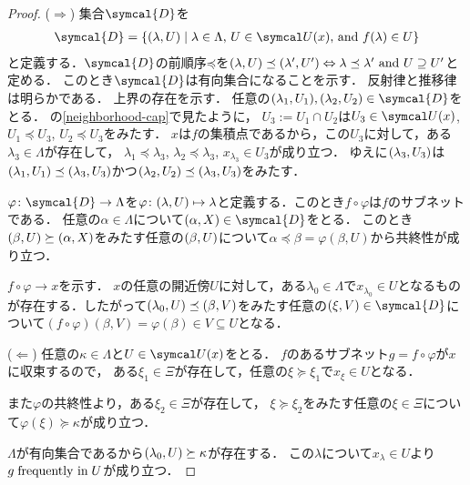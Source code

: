 \documentclass{ltjsbook}
\begin{document}
\begin{proof} (\(\Rightarrow\)) 集合\(\symcal{D}\)を
\begin{align*}
    \symcal{D} = \{\tuple{\lambda, U} \mid \text{\(\lambda \in \Lambda\), \(U \in \OpenNeighborhood{x}\), and \(f(\lambda) \in U\)}\}
\end{align*}
と定義する．\(\symcal{D}\)の前順序\(\mathord{\preceq}\)を\((\lambda, U) \preceq (\lambda', U') \Leftrightarrow \lambda \preceq \lambda'\ \text{and}\ U \supseteq U'\)と定める．
このとき\(\symcal{D}\)は有向集合になることを示す．
反射律と推移律は明らかである．
上界の存在を示す．
任意の\(\tuple{\lambda_1, U_1}, \tuple{\lambda_2, U_2} \in \symcal{D}\)をとる．
の\ref{neighborhood-cap}で見たように，
\(U_3 := U_1 \cap U_2\)は\(U_3 \in \OpenNeighborhood{x}\), \(U_1 \preceq U_3\), \(U_2 \preceq U_3\)をみたす．
\(x\)は\(f\)の集積点であるから，この\(U_3\)に対して，ある\(\lambda_3 \in \Lambda\)が存在して，
\(\lambda_1 \preceq \lambda_3\), \(\lambda_2 \preceq \lambda_3\), \(x_{\lambda_3} \in U_3\)が成り立つ．
ゆえに\((\lambda_3, U_3)\)は\((\lambda_1, U_1) \preceq (\lambda_3, U_3)\)かつ\((\lambda_2, U_2) \preceq (\lambda_3, U_3)\)をみたす．

\(\varphi \colon \symcal{D} \to \Lambda\)を\(\varphi\colon (\lambda, U) \mapsto \lambda\)と定義する．このとき\(f \circ \varphi\)は\(f\)のサブネットである．
任意の\(\alpha \in \Lambda\)について\(\tuple{\alpha, X} \in \symcal{D}\)をとる．
このとき\((\beta, U) \succeq (\alpha, X)\)をみたす任意の\((\beta, U)\)について\(\alpha \preceq \beta = \varphi(\beta, U)\)から共終性が成り立つ．

\(f \circ \varphi \to x\)を示す．
\(x\)の任意の開近傍\(U\)に対して，ある\(\lambda_0 \in \Lambda\)で\(x_{\lambda_0} \in U\)となるものが存在する．したがって\((\lambda_0, U) \preceq (\beta, V)\)をみたす任意の\(\tuple{\xi, V} \in \symcal{D}\)について\((f \circ \varphi)(\beta, V) = \varphi(\beta) \in V \subseteq U\)となる．

\noindent (\(\Leftarrow\)) 任意の\(\kappa \in \Lambda\)と\(U \in \OpenNeighborhood{x}\)をとる．
\(f\)のあるサブネット\(g = f \circ \varphi\)が\(x\)に収束するので，
ある\(\xi_1 \in \Xi\)が存在して，任意の\(\xi \succeq \xi_1\)で\(x_\xi \in U\)となる．

また\(\varphi\)の共終性より，ある\(\xi_2 \in \Xi\)が存在して，
\(\xi \succeq \xi_2\)をみたす任意の\(\xi \in \Xi\)について\(\varphi(\xi) \succeq \kappa\)が成り立つ．

\(\Lambda\)が有向集合であるから\((\lambda_0, U) \succeq \kappa\)が存在する．
この\(\lambda\)について\(x_\lambda \in U\)より\(g \mathrel{\text{frequently in}} U\)が成り立つ．
\end{proof}
\end{document}
